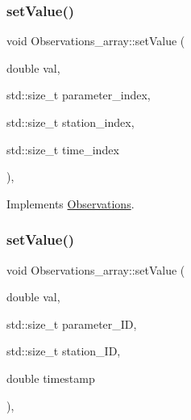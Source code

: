 \mbox{\label{class_observations__array_aa6b6e042f8db0afad3beaff248b4a602}} 
\subsubsection{\texorpdfstring{set\+Value()}{setValue()}\hspace{0.1cm}{\footnotesize\ttfamily [1/2]}}
{\footnotesize\ttfamily void Observations\+\_\+array\+::set\+Value (\begin{DoxyParamCaption}\item[{double}]{val,  }\item[{std\+::size\+\_\+t}]{parameter\+\_\+index,  }\item[{std\+::size\+\_\+t}]{station\+\_\+index,  }\item[{std\+::size\+\_\+t}]{time\+\_\+index }\end{DoxyParamCaption})\hspace{0.3cm}{\ttfamily [override]}, {\ttfamily [virtual]}}



Implements \mbox{\hyperlink{class_observations_a6f00b4a2277ce9e77cd0d5975f4066f8}{Observations}}.

\mbox{\label{class_observations__array_a3994f0e11a8207c5e1182a9b20a67ec4}} 
\subsubsection{\texorpdfstring{set\+Value()}{setValue()}\hspace{0.1cm}{\footnotesize\ttfamily [2/2]}}
{\footnotesize\ttfamily void Observations\+\_\+array\+::set\+Value (\begin{DoxyParamCaption}\item[{double}]{val,  }\item[{std\+::size\+\_\+t}]{parameter\+\_\+\+ID,  }\item[{std\+::size\+\_\+t}]{station\+\_\+\+ID,  }\item[{double}]{timestamp }\end{DoxyParamCaption})\hspace{0.3cm}{\ttfamily [override]}, {\ttfamily [virtual]}}



